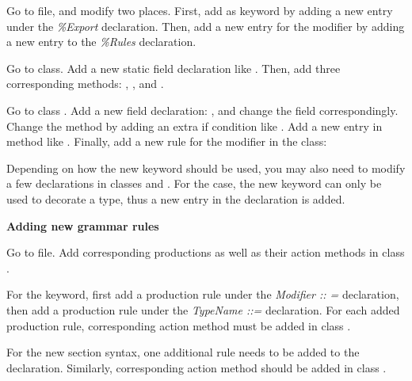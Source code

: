 \documentclass{article}
\begin{document}
\begin{enumerate}

\Item Go to  file, and modify two places. First, add  as keyword by adding a new entry under the \textit{\%Export} declaration. Then, add a new entry for the  modifier by adding a new entry to the \textit{\%Rules} declaration.

\Item Go to  class. Add a new static field declaration like . Then, add three corresponding methods: , , and .  

\Item Go to class . Add a new field declaration: , and change the field  correspondingly.  Change the  method by adding an extra if condition like  .  Add a new entry in method  like  . Finally, add a new rule for the modifier  in the  class:



\Item Depending on how the new keyword should be used, you may also need to modify a few declarations in classes  
and . For the  case, the new keyword can only be used to decorate a type, thus  a new entry in the  declaration is added.

\end{enumerate}

\textbf{Adding new grammar rules}

\begin{enumerate}

\Item Go to  file. Add corresponding productions as well as their action methods in class .

\Item For the  keyword, first add a production rule under the \textit{Modifier :: =} declaration, then add a production rule under the \textit{TypeName ::= } declaration. For each added production rule, corresponding action method must be added in class .

\Item For the new  section syntax, one additional rule needs to be added to the  declaration. Similarly, corresponding action method should be added in class .

\end{enumerate}
\end{document}
